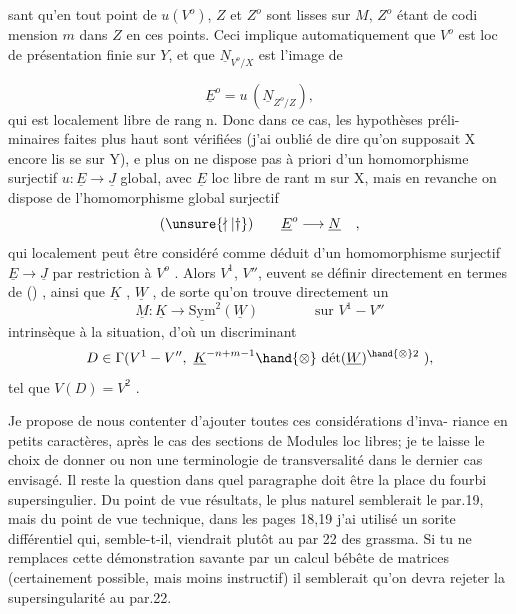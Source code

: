 
sant qu'en tout point de $u(V^{o})$, $Z$ et $Z^{o}$ sont lisses sur $M$, $Z^{o}$ étant de codi
mension $m$ dans $Z$ en ces points. Ceci implique automatiquement que $V^{o}$ est
loc de présentation finie sur $Y$, et que $\underline{N}_{V^{o}/X}$ est l'image de

\[ \underline{E}^{o} = u\,(\underline{N}_{Z^{o}/Z}) , \]
qui est localement libre de rang n. Donc dans ce cas, les hypothèses préli-%
minaires faites plus haut sont vérifiées (j'ai oublié de dire qu'on supposait
X encore lis se sur Y), e plus on ne dispose pas\unsure{,} à priori d'un homomorphisme
surjectif $u:\underline{E}\rightarrow\underline{J}$ global, avec $\underline{E}$ loc libre de rant m sur X, mais en revanche
on dispose de l'homomorphisme global surjectif
\[ (\unsure{\nmid|\dagger}) \qquad \underline{E}^{o}\longrightarrow \underline{N}_{} \quad , \]
qui localement peut être considéré comme déduit d'un homomorphisme surjectif
$\underline{E}\rightarrow\underline{J}$ par restriction à $V^{o}$ . Alors $V^{1}$, $V''$, euvent se définir directement
en termes de (\unsure{$\nmid$|$\dagger$}) , ainsi que $\underline{K}$ , $\underline{W}$ , de sorte qu'on trouve directement un
\[ \underline{M} : \underline{K}\rightarrow \underline{\mathrm{Sym}}^{2}(\underline{W}) \qquad\qquad \text{sur } V^{1}-V'' \]
intrinsèque à la situation, d'où  un discriminant
\[ D \in \Gamma(V^{1}-V'',\ \underline{K}^{-n+m-1}\hand{\otimes}\ \text{dét}(\underline{W})^{\hand{\otimes}2}\ ), \]
tel que $V(D) = V^{2}$ .

Je propose de nous contenter d'ajouter toutes ces considérations d'inva-%
riance en petits caractères, après le cas des sections de Modules loc libres;
je te laisse le choix de donner ou non une terminologie de transversalité dans
le dernier cas envisagé. Il reste la question dans quel paragraphe doit être
la place du fourbi supersingulier. Du point de vue résultats, le plus naturel
semblerait le par.19, mais du point de vue technique, dans les pages 18,19
j'ai utilisé un sorite différentiel qui, semble-t-il, viendrait plutôt au par
22 des grassma. Si tu ne remplaces cette démonstration savante par un
calcul bébête de matrices (certainement possible, mais moins instructif) il
semblerait qu'on devra rejeter la supersingularité au par.22.

